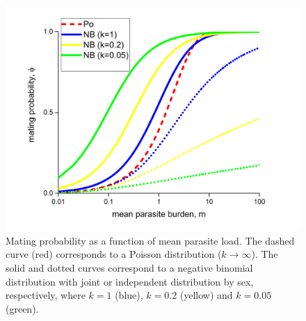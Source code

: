 \documentclass[12pt,a4paper]{article}
\theoremstyle{plain}%
\theoremstyle{definition}
\theoremstyle{remark}
\begin{document}
\begin{figure}
	\centering 	\includegraphics[width=0.9\linewidth]{phi-indep}
	\caption{Mating probability as a function of mean parasite load. The dashed curve (red) corresponds to a Poisson distribution ($k\to \infty$). The solid and dotted curves correspond to a negative binomial distribution with joint or independent distribution by sex, respectively, where $k = 1$ (blue), $k =0.2$ (yellow) and $k =0.05$ (green).
	} 
	\label{fig:funphi}
\end{figure}
\end{document}
